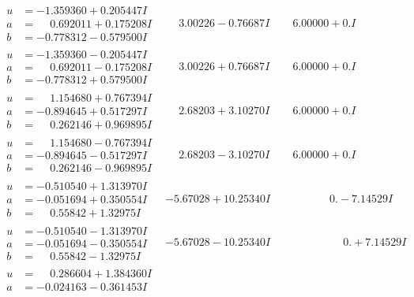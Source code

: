 \documentclass[1p]{elsarticle_modified}
\theoremstyle{definition}
\begin{document}
$$\begin{array}{c|c|c}
\begin{aligned}
u &= -1.359360 + 0.205447 I \\
a &= \phantom{-}0.692011 + 0.175208 I \\
b &= -0.778312 - 0.579500 I\end{aligned}
 & \phantom{-}3.00226 - 0.76687 I & \phantom{-}6.00000 + 0. I\phantom{ +0.000000I} \\ \hline\begin{aligned}
u &= -1.359360 - 0.205447 I \\
a &= \phantom{-}0.692011 - 0.175208 I \\
b &= -0.778312 + 0.579500 I\end{aligned}
 & \phantom{-}3.00226 + 0.76687 I & \phantom{-}6.00000 + 0. I\phantom{ +0.000000I} \\ \hline\begin{aligned}
u &= \phantom{-}1.154680 + 0.767394 I \\
a &= -0.894645 + 0.517297 I \\
b &= \phantom{-}0.262146 + 0.969895 I\end{aligned}
 & \phantom{-}2.68203 + 3.10270 I & \phantom{-}6.00000 + 0. I\phantom{ +0.000000I} \\ \hline\begin{aligned}
u &= \phantom{-}1.154680 - 0.767394 I \\
a &= -0.894645 - 0.517297 I \\
b &= \phantom{-}0.262146 - 0.969895 I\end{aligned}
 & \phantom{-}2.68203 - 3.10270 I & \phantom{-}6.00000 + 0. I\phantom{ +0.000000I} \\ \hline\begin{aligned}
u &= -0.510540 + 1.313970 I \\
a &= -0.051694 + 0.350554 I \\
b &= \phantom{-}0.55842 + 1.32975 I\end{aligned}
 & -5.67028 + 10.25340 I & \phantom{-0.000000 } 0. - 7.14529 I \\ \hline\begin{aligned}
u &= -0.510540 - 1.313970 I \\
a &= -0.051694 - 0.350554 I \\
b &= \phantom{-}0.55842 - 1.32975 I\end{aligned}
 & -5.67028 - 10.25340 I & \phantom{-0.000000 -}0. + 7.14529 I \\ \hline\begin{aligned}
u &= \phantom{-}0.286604 + 1.384360 I \\
a &= -0.024163 - 0.361453 I \\

\end{aligned}
\end{array}$$
\end{document}
